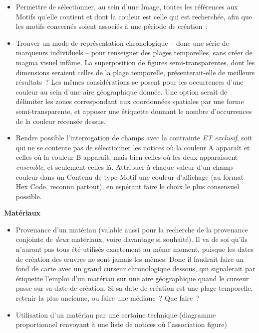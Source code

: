\documentclass[a4paper,12pt, twoside]{book}
\begin{document}
\begin{itemize}
    \begin{itemize}
        \item Permettre de sélectionner, au sein d’une \textsf{Image}, toutes les références aux \textsf{Motifs} qu’elle contient et dont la couleur est celle qui est recherchée, afin que les motifs concernés soient associés à une période de création~;\\

        \item Trouver un mode de représentation chronologique – donc une série de marqueurs individuels – pour renseigner des plages temporelles, sans créer de magma visuel infâme. La superposition de figures semi-transparentes, dont les dimensions seraient celles de la plage temporelle, présenterait-elle de meilleurs résultats~? Les mêmes considérations se posent pour les occurrences d’une couleur au sein d’une aire géographique donnée. Une option serait de délimiter les zones correspondant aux coordonnées spatiales par une forme semi-transparente, et apposer une étiquette donnant le nombre d’occurrences de la couleur recensée dessus.\\

        \item Rendre possible l’interrogation de champs avec la contrainte \textit{ET exclusif}, soit qui ne se contente pas de sélectionner les notices où la couleur A apparaît et celles où la couleur B apparaît, mais bien celles où les deux apparaissent \textit{ensemble}, et seulement celles-là. Attribuer à chaque valeur d’un champ couleur dans un Contenu de type \textsf{Motif} une couleur d’affichage (au format Hex Code, reconnu partout), en espérant faire le choix le plus consensuel possible.
    \end{itemize}
\end{itemize}    

\large \textbf{\textcolor{teal2}{Matériaux}}\\

\normalsize
\begin{itemize}
    \item Provenance d’un matériau (valable aussi pour la recherche de la provenance conjointe de \textit{deux} matériaux, voire davantage si souhaité). Il va de soi qu’ils n’auront pas tous été utilisés exactement au même moment, puisque les dates de création des œuvres ne sont jamais les mêmes. Donc il faudrait faire un fond de carte avec un grand curseur chronologique dessous, qui signalerait par étiquette l’emploi d’un matériau sur une aire géographique quand le curseur passe sur sa date de création. Si sa date de création est une plage temporelle, retenir la plus ancienne, ou faire une médiane~? Que faire~?\\

    \item Utilisation d’un matériau par une certaine technique (diagramme proportionnel renvoyant à une liste de notices où l’association figure)
\end{itemize}    
\end{document}
